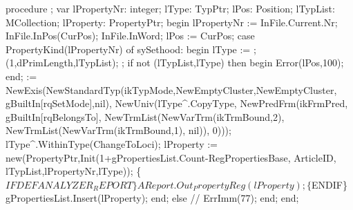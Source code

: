 procedure ;
var
   lPropertyNr: integer;
   lType: TypPtr;
   lPos: Position;
   lTypList: MCollection;
   lProperty: PropertyPtr;
begin
   lPropertyNr := InFile.Current.Nr;
   InFile.InPos(CurPos); InFile.InWord;
   lPos := CurPos;
   case PropertyKind(lPropertyNr) of
      sySethood:
         begin
            lType := ;
            (1,dPrimLength,lTypList);
            ;
            if not (lTypList,lType) then
            begin
               Error(lPos,100);
            end;
             := NewExis(NewStandardTyp(ikTypMode,NewEmptyCluster,NewEmptyCluster,
                                                    gBuiltIn[rqSetMode],nil),
                                     NewUniv(lType^.CopyType,
                                             NewPredFrm(ikFrmPred,
                                                        gBuiltIn[rqBelongsTo],
                                                        NewTrmList(NewVarTrm(ikTrmBound,2),
                                                                   NewTrmList(NewVarTrm(ikTrmBound,1),
                                                                              nil)),
                                                        0)));
            lType^.WithinType(ChangeToLoci);
            lProperty := new(PropertyPtr,Init(1+gPropertiesList.Count-RegPropertiesBase, ArticleID,
                                              lTypList,lPropertyNr,lType));
            \{$IFDEF ANALYZER_REPORT\}
            AReport.Out_PropertyReg(lProperty);
            \{$ENDIF\}
            gPropertiesList.Insert(lProperty);
         end;
   else
      //   ErrImm(77);
   end;
end;
\eatline
{}\nwendcode{}\nwdocspar
